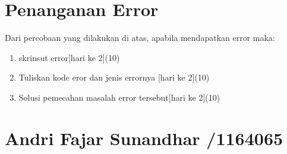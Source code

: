 \section{Penanganan Error}
Dari percobaan yang dilakukan di atas, apabila mendapatkan error maka:

\begin{enumerate}
	\item
	skrinsut error[hari ke 2](10)
	\item
Tuliskan kode eror dan jenis errornya [hari ke 2](10)
	\item
Solusi pemecahan masalah error tersebut[hari ke 2](10)

\end{enumerate}

\section{Andri Fajar Sunandhar /1164065}

